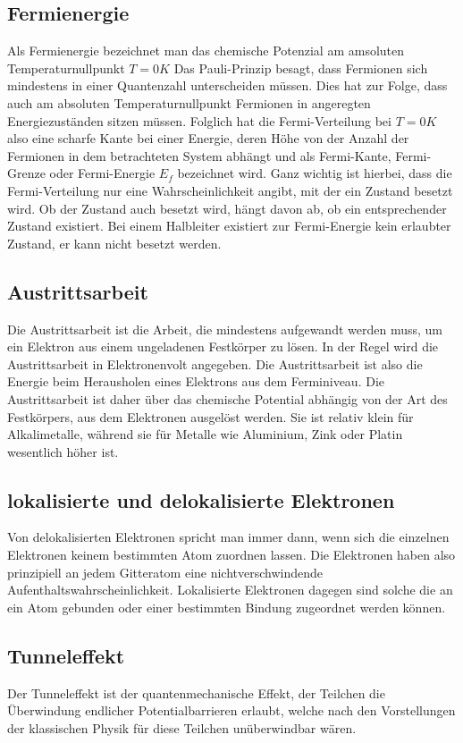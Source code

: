 \documentclass[12pt]{article}
\begin{document}
\subsection{Fermienergie}
Als Fermienergie bezeichnet man das chemische Potenzial am amsoluten Temperaturnullpunkt $T = 0K$
Das Pauli-Prinzip besagt, dass Fermionen sich mindestens in einer Quantenzahl unterscheiden müssen. Dies hat zur Folge, dass auch am absoluten Temperaturnullpunkt Fermionen in angeregten Energiezuständen sitzen müssen. Folglich hat die Fermi-Verteilung bei $T = 0 K$ also eine scharfe Kante bei einer Energie, deren Höhe von der Anzahl der Fermionen in dem betrachteten System abhängt und als Fermi-Kante, Fermi-Grenze oder Fermi-Energie $E_f$ bezeichnet wird. Ganz wichtig ist hierbei, dass die Fermi-Verteilung nur eine Wahrscheinlichkeit angibt, mit der ein Zustand besetzt wird. Ob der Zustand auch besetzt wird, hängt davon ab, ob ein entsprechender Zustand existiert. Bei einem Halbleiter existiert zur Fermi-Energie kein erlaubter Zustand, er kann nicht besetzt werden.

\subsection{Austrittsarbeit}
Die Austrittsarbeit ist die Arbeit, die mindestens aufgewandt werden muss, um ein Elektron aus einem ungeladenen Festkörper zu lösen. In der Regel wird die Austrittsarbeit in Elektronenvolt angegeben. Die Austrittsarbeit ist also die Energie beim Herausholen eines Elektrons aus dem Ferminiveau. Die Austrittsarbeit ist daher über das chemische Potential abhängig von der Art des Festkörpers, aus dem Elektronen ausgelöst werden. Sie ist relativ klein für Alkalimetalle, während sie für Metalle wie Aluminium, Zink oder Platin wesentlich höher ist.

\subsection{lokalisierte und delokalisierte Elektronen}
Von delokalisierten Elektronen spricht man immer dann, wenn sich die einzelnen Elektronen keinem bestimmten Atom zuordnen lassen. Die Elektronen haben also prinzipiell an jedem Gitteratom eine nichtverschwindende Aufenthaltswahrscheinlichkeit.
Lokalisierte Elektronen dagegen sind solche die an ein Atom gebunden oder einer bestimmten Bindung zugeordnet werden können.

\subsection{Tunneleffekt}
Der Tunneleffekt ist der quantenmechanische Effekt, der Teilchen die Überwindung endlicher Potentialbarrieren erlaubt, welche nach den Vorstellungen der klassischen Physik für diese Teilchen unüberwindbar wären.
\end{document}
